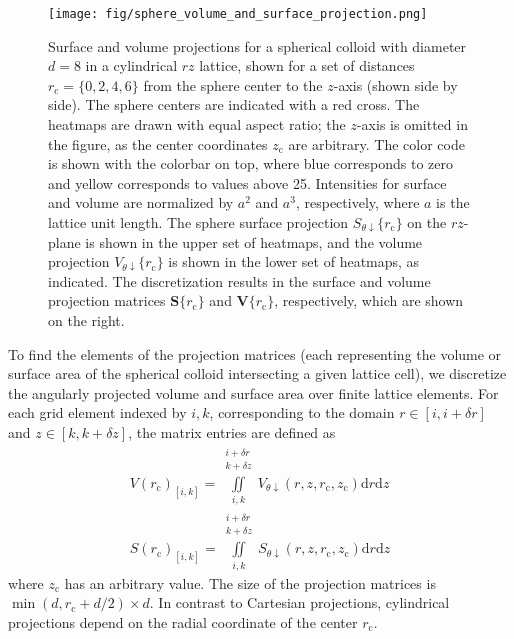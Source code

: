 \documentclass[10pt, a4paper]{article}
\begin{document}
\begin{multicols}{2}
\begin{figure}[H]
    \centering
    \texttt{[image: fig/sphere\_volume\_and\_surface\_projection.png]}
    \caption{
        Surface and volume projections for a spherical colloid with diameter $d = 8$ in a cylindrical $rz$ lattice, shown for a set of distances $r_{\text{c}} = \{0, 2, 4, 6\}$ from the sphere center to the $z$-axis (shown side by side).
        The sphere centers are indicated with a red cross.
        The heatmaps are drawn with equal aspect ratio; the $z$-axis is omitted in the figure, as the center coordinates $z_{\text{c}}$ are arbitrary.
        The color code is shown with the colorbar on top, where blue corresponds to zero and yellow corresponds to values above 25.
        Intensities for surface and volume are normalized by $a^2$ and $a^3$, respectively, where $a$ is the lattice unit length.
        The sphere surface projection $S_{\theta \downarrow}\{r_{\text{c}}\}$ on the $rz$-plane is shown in the upper set of heatmaps, and the volume projection $V_{\theta \downarrow}\{r_{\text{c}}\}$ is shown in the lower set of heatmaps, as indicated.
        The discretization results in the surface and volume projection matrices $\bm{S}\{r_{\text{c}}\}$ and $\bm{V}\{r_{\text{c}}\}$, respectively, which are shown on the right.
    }
    \label{fig:sphere_volume_and_surface_projection}
\end{figure}

To find the elements of the projection matrices (each representing the volume or surface area of the spherical colloid intersecting a given lattice cell), we discretize the angularly projected volume and surface area over finite lattice elements.
For each grid element indexed by $i, k$, corresponding to the domain $r \in [i, i + \delta r]$ and $z \in [k, k + \delta z]$, the matrix entries are defined as
\begin{eqnarray}
    V(r_{\text{c}})_{[i, k]} = \iint \limits_{i, k}^{\substack{i+\delta r\\ k+\delta z}} V_{\theta \downarrow} (r, z, r_{\text{c}}, z_{\text{c}}) \text{d}r \text{d}z
    \\
    S(r_{\text{c}})_{[i, k]} = \iint \limits_{i, k}^{\substack{i+\delta r\\ k+\delta z}} S_{\theta \downarrow} (r, z, r_{\text{c}}, z_{\text{c}}) \text{d}r \text{d}z
\end{eqnarray}
where $z_{\text{c}}$ has an arbitrary value.
The size of the projection matrices is $\min(d, r_{\text{c}} + d/2) \times d$.
In contrast to Cartesian projections, cylindrical projections depend on the radial coordinate of the center $r_{\text{c}}$.


\end{multicols}
\end{document}
